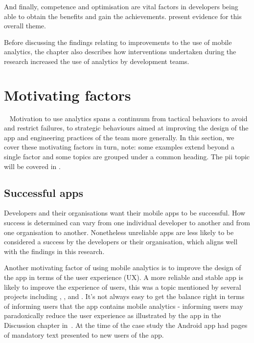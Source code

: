 And finally, competence and optimisation are vital factors in developers being able to obtain the benefits and gain the achievements.  present evidence for this overall theme.

Before discussing the findings relating to improvements to the use of mobile analytics, the chapter also describes how interventions undertaken during the research increased the use of analytics by development teams.

\section{Motivating factors}~\label{aiu-motivating-factors-theme}
Motivation to use analytics spans a continuum from tactical behaviors to avoid and restrict failures, to strategic behaviours aimed at improving the design of the app and engineering practices of the team more generally.  In this section, we cover these motivating factors in turn, note: some examples extend beyond a single factor and some topics are grouped under a common heading. The \Gls{pii} topic will be covered in .

\subsection{Successful apps}\label{successful-apps-topic}
Developers and their organisations want their mobile apps to be successful. How success is determined can vary from one individual developer to another and from one organisation to another. Nonetheless unreliable apps are less likely to be considered a success by the developers or their organisation, which aligns well with the findings in this research.

Another motivating factor of using mobile analytics is to improve the design of the app in terms of the user experience (UX). A more reliable and stable app is likely to improve the experience of users, this was a topic mentioned by several projects including , , and . It's not always easy to get the balance right in terms of informing users that the app contains mobile analytics - informing users may paradoxically reduce the user experience as illustrated by the  app in the Discussion chapter in~. At the time of the case study the Android app had pages of mandatory text presented to new users of the app.

